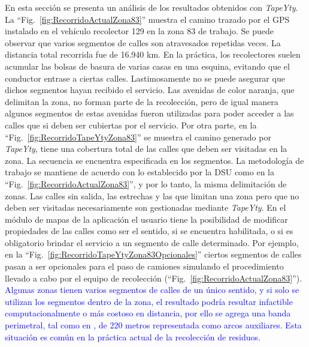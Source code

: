 \documentclass[spanish, conference]{IEEEtran}
\begin{document}
{En esta sección se presenta un análisis de los resultados obtenidos con \textit{TapeYty}.
La ``Fig.~\ref{fig:RecorridoActualZona83}'' muestra el camino trazado por el GPS instalado en el vehículo recolector 129 en la zona 83 de trabajo. Se puede observar que varios segmentos de calles son atravesados repetidas veces. La distancia total recorrida fue de 16.940 km. En la práctica, los recolectores suelen acumular las bolsas de basura de varias casas en una esquina, evitando que el conductor entrase a ciertas calles. Lastimosamente no se puede asegurar que dichos segmentos hayan recibido el servicio. Las avenidas de color naranja, que delimitan la zona, no forman parte de la recolección, pero de igual manera algunos segmentos de estas avenidas fueron utilizadas para poder acceder a las calles que si deben ser cubiertas por el servicio.
Por otra parte, en la ``Fig.~\ref{fig:RecorridoTapeYtyZona83}'' se muestra el camino generado por \textit{TapeYty}, tiene una cobertura total de las calles que deben ser visitadas en la zona. La secuencia se encuentra especificada en los segmentos. La metodología de trabajo se mantiene de acuerdo con lo establecido por la DSU como en la ``Fig.~\ref{fig:RecorridoActualZona83}'', y por lo tanto, la misma delimitación de zonas.
Las calles sin salida, las estrechas y las que limitan una zona pero que no deben ser visitadas necesariamente son gestionadas mediante \textit{TapeYty}. En el módulo de mapas de la aplicación el usuario tiene la posibilidad de modificar propiedades de las calles como ser el sentido, si se encuentra habilitada, o si es obligatorio brindar el servicio a un segmento de calle determinado. Por ejemplo, en la ``Fig.~\ref{fig:RecorridoTapeYtyZona83Opcionales}'' ciertos segmentos de calles pasan a ser opcionales para el paso de camiones simulando el procedimiento llevado a cabo por el equipo de recolección (``Fig.~\ref{fig:RecorridoActualZona83}'').
\textcolor{blue}{Algunas zonas tienen varios segmentos de calles de un único sentido, y si solo se utilizan los segmentos dentro de la zona, el resultado podría resultar infactible computacionalmente o más costoso en distancia, por ello se agrega una banda perimetral, tal como en \cite{Braier2017AnArgentina}, de 220 metros representada como arcos auxiliares. Esta situación es común en la práctica actual de la recolección de residuos.}

}
\end{document}
